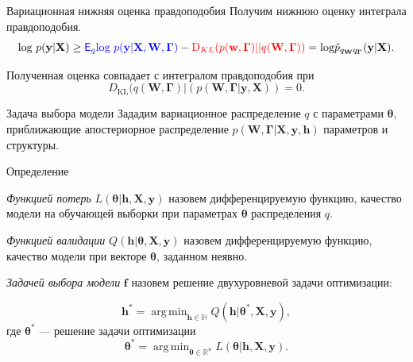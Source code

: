 \documentclass[usenames,dvipsnames,11pt,pdf,utf8,russian,aspectratio=43]{beamer}
\DeclareMathOperator*{\argmin}{arg\,min}
\begin{document}
\begin{frame}{Вариационная нижняя оценка правдоподобия}
Получим нижнюю оценку интеграла правдоподобия.\\
$$                                                                                                                                              
        \text{log}~p(\mathbf{y}|\mathbf{X}) \geq 
\textcolor{blue}{\mathsf{E}_q \text{log}~{p(\mathbf{y} | \mathbf{X}, \mathbf{W}, \boldsymbol{\Gamma})}} - \textcolor{red}{\text{D}_{KL}(p(\mathbf{w}, \boldsymbol{\Gamma}) || q(\mathbf{W}, \boldsymbol{\Gamma}))} = \text{log}\hat{{p}}_{q_{\mathbf{W}}q_{\boldsymbol{\Gamma}}}(\mathbf{y}|\mathbf{X}).
$$ 



Полученная оценка совпадает с интегралом правдоподобия при $$D_\text{KL}(q(\mathbf{W}, \boldsymbol{\Gamma})|(p(\mathbf{W}, \boldsymbol{\Gamma}|\mathbf{y}, \mathbf{X}))=0.$$

\end{frame}      


\begin{frame}{Задача выбора модели}
\footnotesize
Зададим вариационное распределение $q$ с параметрами $\boldsymbol{\theta}$, приближающие апостериорное распределение $p(\mathbf{W}, \boldsymbol{\Gamma}|\mathbf{X}, \mathbf{y}, \mathbf{h})$ параметров и структуры.



\begin{block}{Определение}

\textit{Функцией потерь} $L( \boldsymbol{\theta}| \mathbf{h}, \mathbf{X}, \mathbf{y})$   назовем дифференцируемую функцию, качество модели на обучающей выборки при параметрах $\boldsymbol{\theta}$ распределения $q$.
\end{block}
\begin{block}{}
\textit{Функцией валидации} $Q(\mathbf{h}| \boldsymbol{\theta}, \mathbf{X}, \mathbf{y} )$ назовем дифференцируемую функцию, качество модели при векторе $\boldsymbol{\theta}$, заданном неявно.
\end{block}
\begin{block}{}
\textit{Задачей выбора модели} $\mathbf{f}$ назовем решение двухуровневой задачи оптимизации:

\[
	\mathbf{h}^{*} = \argmin_{\mathbf{h} \in \mathbb{H}} Q(\mathbf{h}|  \boldsymbol{\theta}^{*}, \mathbf{X}, \mathbf{y} ),
\]
где $\boldsymbol{\theta}^{*}$ --- решение задачи оптимизации
\[
   \boldsymbol{\theta}^{*} = \argmin_{\boldsymbol{\theta} \in \mathbb{R}^u} L(\boldsymbol{\theta}|  \mathbf{h},  \mathbf{X}, \mathbf{y}).
\]
\end{block}


\end{frame}
\end{document}
